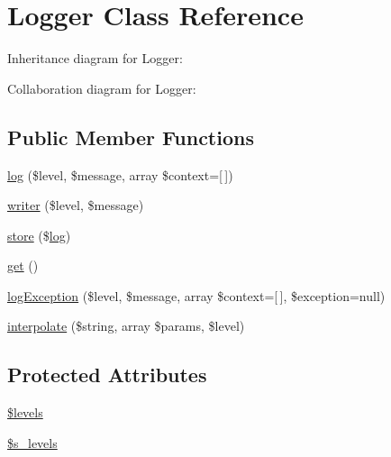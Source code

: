 \hypertarget{class_zest_1_1_common_1_1_logger_1_1_logger}{}\section{Logger Class Reference}
\label{class_zest_1_1_common_1_1_logger_1_1_logger}


Inheritance diagram for Logger\+:


Collaboration diagram for Logger\+:
\subsection*{Public Member Functions}
\begin{DoxyCompactItemize}
\item 
\mbox{\hyperlink{class_zest_1_1_common_1_1_logger_1_1_logger_ad320d8ce87763c6e2d94b69584ccae3f}{log}} (\$level, \$message, array \$context=\mbox{[}$\,$\mbox{]})
\item 
\mbox{\hyperlink{class_zest_1_1_common_1_1_logger_1_1_logger_a7f339e399ed414670f78d235029b7f3e}{writer}} (\$level, \$message)
\item 
\mbox{\hyperlink{class_zest_1_1_common_1_1_logger_1_1_logger_a098c8f4c30f69fc243717fa32eb4ddbf}{store}} (\$\mbox{\hyperlink{class_zest_1_1_common_1_1_logger_1_1_logger_ad320d8ce87763c6e2d94b69584ccae3f}{log}})
\item 
\mbox{\hyperlink{class_zest_1_1_common_1_1_logger_1_1_logger_ac33ee765f5ad9f134540bac393721cfe}{get}} ()
\item 
\mbox{\hyperlink{class_zest_1_1_common_1_1_logger_1_1_logger_aa29dd6a68594af040bbc3a809f110e02}{log\+Exception}} (\$level, \$message, array \$context=\mbox{[}$\,$\mbox{]}, \$exception=null)
\item 
\mbox{\hyperlink{class_zest_1_1_common_1_1_logger_1_1_logger_a893257e3671946329ca52be5c62d7e8d}{interpolate}} (\$string, array \$params, \$level)
\end{DoxyCompactItemize}
\subsection*{Protected Attributes}
\begin{DoxyCompactItemize}
\item 
\mbox{\hyperlink{class_zest_1_1_common_1_1_logger_1_1_logger_a1035dc0448354cc79f8f9e1ca8dfd0cb}{\$levels}}
\item 
\mbox{\hyperlink{class_zest_1_1_common_1_1_logger_1_1_logger_a8c18f63e92d4d3645843e50a64cbb50e}{\$s\+\_\+levels}}
\end{DoxyCompactItemize}


